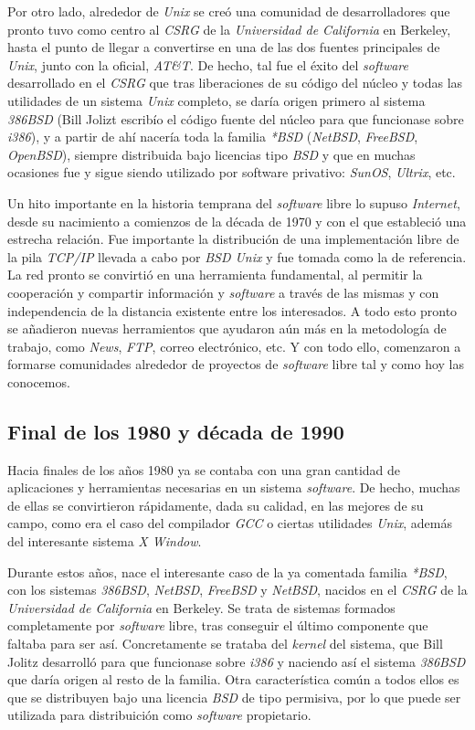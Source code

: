 Por otro lado, alrededor de \textit{Unix} se creó una comunidad de
desarrolladores que pronto tuvo como centro al \textit{CSRG} de la
\textit{Universidad de California} en Berkeley, hasta el punto de llegar a
convertirse en una de las dos fuentes principales de \textit{Unix}, junto con la
oficial, \textit{AT\&T}. De hecho, tal fue el éxito del \textit{software}
desarrollado en el \textit{CSRG} que tras liberaciones de su código del núcleo y
todas las utilidades de un sistema \textit{Unix} completo, se daría origen
primero al sistema \textit{386BSD} (Bill Jolizt escribío el código fuente del
núcleo para que funcionase sobre \textit{i386}), y a partir de ahí nacería toda
la familia \textit{*BSD} (\textit{NetBSD}, \textit{FreeBSD}, \textit{OpenBSD}),
siempre distribuida bajo licencias tipo \textit{BSD} y que en muchas ocasiones
fue y sigue siendo utilizado por software privativo: \textit{SunOS},
\textit{Ultrix}, etc.

Un hito importante en la historia temprana del \textit{software} libre lo supuso
\textit{Internet}, desde su nacimiento a comienzos de la década de 1970 y con el
que estableció una estrecha relación. Fue importante la distribución de una
implementación libre de la pila \textit{TCP/IP} llevada a cabo por \textit{BSD
Unix} y fue tomada como la de referencia. La red pronto se convirtió en una
herramienta fundamental, al permitir la cooperación y compartir información y
\textit{software} a través de las mismas y con independencia de la distancia
existente entre los interesados. A todo esto pronto se añadieron nuevas
herramientos que ayudaron aún más en la metodología de trabajo, como
\textit{News}, \textit{FTP}, correo electrónico, etc. Y con todo ello,
comenzaron a formarse comunidades alrededor de proyectos de \textit{software}
libre tal y como hoy las conocemos.

\subsection{Final de los 1980 y década de 1990}

Hacia finales de los años 1980 ya se contaba con una gran cantidad de
aplicaciones y herramientas necesarias en un sistema \textit{software}. De
hecho, muchas de ellas se convirtieron rápidamente, dada su calidad, en las
mejores de su campo, como era el caso del compilador \textit{GCC} o ciertas
utilidades \textit{Unix}, además del interesante sistema \textit{X Window}.

Durante estos años, nace el interesante caso de la ya comentada familia
\textit{*BSD}, con los sistemas \textit{386BSD}, \textit{NetBSD},
\textit{FreeBSD} y \textit{NetBSD}, nacidos en el \textit{CSRG} de la
\textit{Universidad de California} en Berkeley. Se trata de sistemas formados
completamente por \textit{software} libre, tras conseguir el último componente
que faltaba para ser así. Concretamente se trataba del \textit{kernel} del
sistema, que Bill Jolitz desarrolló para que funcionase sobre \textit{i386} y
naciendo así el sistema \textit{386BSD} que daría origen al resto de la familia.
Otra característica común a todos ellos es que se distribuyen bajo una licencia
\textit{BSD} de tipo permisiva, por lo que puede ser utilizada para
distribuición como \textit{software} propietario.


